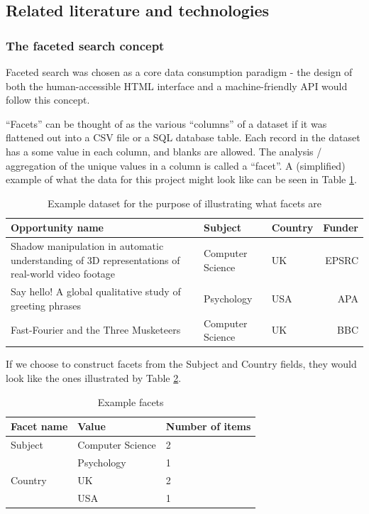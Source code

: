 \documentclass[11pt,fleqn,twoside]{article}
\begin{document}
\subsection{Related literature and technologies}
\subsubsection{The faceted search concept}
Faceted search \cite{faceted} was chosen as a core data consumption paradigm - the design of both the human-accessible HTML interface and a machine-friendly API would follow this concept.

``Facets'' can be thought of as the various ``columns'' of a dataset if it was flattened out into a CSV file or a SQL database table. Each record in the dataset has a some value in each column, and blanks are allowed. The analysis / aggregation of the unique values in a column is called a ``facet''. A (simplified) example of what the data for this project might look like can be seen in Table \ref{tab:facets-example}.

\begin{table}[!h]
\centering
\begin{tabular}{p{8cm}|l|l|r}
	Opportunity name & Subject & Country & Funder\\
	\hline
	Shadow manipulation in automatic understanding of 3D representations of real-world video footage & Computer Science & UK & EPSRC\\[6pt]
	Say hello! A global qualitative study of greeting phrases & Psychology & USA & APA\\[6pt]
	Fast-Fourier and the Three Musketeers & Computer Science & UK & BBC\\
\end{tabular}
\caption{Example dataset for the purpose of illustrating what facets are}
\label{tab:facets-example}
\end{table}

If we choose to construct facets from the Subject and Country fields, they would look like the ones illustrated by Table \ref{tab:facets-example2}.
\begin{table}[!h]
\centering
\begin{tabular}{l|l|l}
	Facet name & Value & Number of items\\
	\hline
	Subject & Computer Science & 2\\[3pt]
	 & Psychology & 1\\[3pt]
	Country & UK & 2\\[3pt]
	 & USA & 1\\[3pt]
\end{tabular}
\caption{Example facets}
\label{tab:facets-example2}
\end{table}
\end{document}
